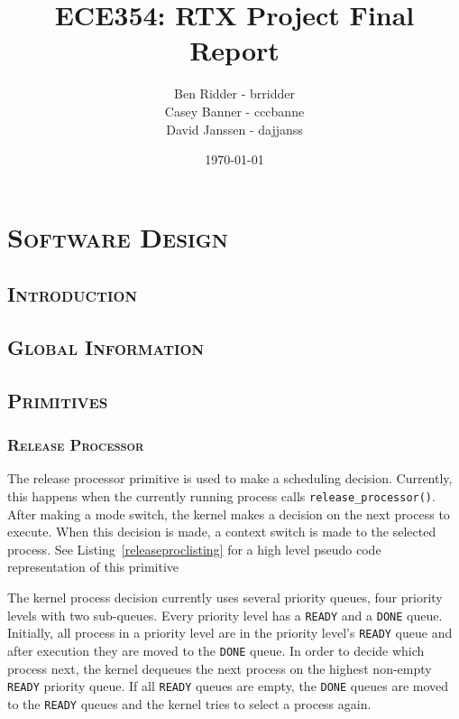 \documentclass[oneside]{report}
\begin{document}
\lstset{language=C, 
        frame=single, 
        breaklines=true,
        basicstyle=\small\ttfamily,
        columns=fullflexible}


\title{ECE354: RTX Project Final Report}
\author{Ben Ridder - brridder \\
Casey Banner - cccbanne \\
David Janssen - dajjanss }
\date{\today}

\maketitle

\tableofcontents

\chapter{\textsc{Software Design}}

\section{\textsc{Introduction}}

\section{\textsc{Global Information}}

\section{\textsc{Primitives}}
\subsection{\textsc{Release Processor}}
The release processor primitive is used to make a scheduling decision.
Currently, this happens when the currently running process calls
\texttt{release\_processor()}. After making a mode switch, the kernel makes a
decision on the next process to execute. When this decision is made, a context
switch is made to the selected process. See Listing~\ref{releaseproclisting}
for a high level pseudo code representation of this primitive

The kernel process decision currently uses several priority queues, four
priority levels with two sub-queues. Every priority level has a \texttt{READY} and a
\texttt{DONE} queue. Initially, all process in a priority level are in the
priority level's \texttt{READY} queue and after execution they are moved to the
\texttt{DONE} queue. In order to decide which process next, the kernel dequeues
the next process on the highest non-empty \texttt{READY} priority queue. If all
\texttt{READY} queues are empty, the \texttt{DONE} queues are moved to the
\texttt{READY} queues and the kernel tries to select a process again.
\end{document}
